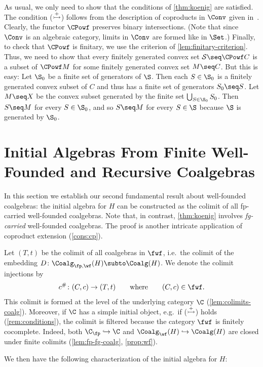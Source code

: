 \documentclass[a4paper,UKenglish, autoref, numberwithinsect, final]{lipics-v2021}
\numberwithin{equation}{section}
\newenvironment{proofhere}[2][Proof of]{%
  \proof{#1~\autoref{#2}}%
}{%
  \endproof%
  \par%
}
\newenvironment{proofappendix}[2][Proof of]{%
    \begin{proofhere}[#1]{#2}
  }{%
    \end{proofhere}
  }
\newcommand{\injmono}{\ensuremath{\overset{\smash{\raisebox{-1pt}{\ensuremath{\scriptstyle+}}}}{\rightarrowtail}}}%
\theoremstyle{plain}
\theoremstyle{definition}
\begin{document}
\begin{proofappendix}{thm:koenig-convex}
As usual, we only need to show that the conditions of \autoref{thm:koenig} are satisfied. The condition (\injmono) follows from the description of coproducts in $\Conv$ given in~\cite[Prop.~5]{jww15}. Clearly, the functor $\CPowf$ preserves binary intersections. (Note that since $\Conv$ is an algebraic category, limits in $\Conv$ are formed like in $\Set$.) Finally, to check that $\CPowf$ is finitary, we use the criterion of \autoref{lem:finitary-criterion}. Thus, we need to show that every finitely generated convex set $\mathcal{S}\seq \CPowf C$ is a subset of $\CPowf M$ for some finitely generated convex set $M\seq C$. But this is easy: Let $\S_0$ be a finite set of generators of $\S$. Then each $S\in \S_0$ is a finitely generated convex subset of $C$ and thus has a finite set of generators $S_0\seq S$. Let $M\seq X$ be the convex subset generated by the finite set $\bigcup_{S\in \S_0} S_0$. Then $S\seq M$ for every $S\in \S_0$, and so $S\seq M$ for every $S\in \S$ because $\S$ is generated by $\S_0$.
\end{proofappendix}

\section{Initial Algebras From Finite Well-Founded and Recursive Coalgebras}\label{sec:initial-algebras}
In this section we establish our second fundamental result about well-founded coalgebras: the initial algebra for $H$ can be constructed as the colimit of all fp-carried well-founded coalgebras. Note that, in contrast, \autoref{thm:koenig} involves \emph{fg-carried} well-founded coalgebras. The proof is another intricate application of coproduct extension (\autoref{cons:cp}).

\begin{construction}\label{not:T}
Let $(T,t)$ be the colimit of all coalgebras in $\fwf$, i.e.\ the colimit of the embedding
$D\colon \Coalg_{\fp,\wf}(H)\subto \Coalg(H)$.
We denote the colimit injections by
\[ c^\#\colon (C,c)\to (T,t) \qquad \text{where} \qquad (C,c)\in \fwf. \]
This colimit is formed at the level of the underlying category $\C$ (\autoref{lem:colimits-coalg}). Moreover, if $\C$  has a simple initial object, e.g.~if (\injmono) holds (\autoref{rem:conditions}), the colimit is filtered because the category $\fwf$ is finitely cocomplete. Indeed, both $\C_\fp\hookrightarrow \C$ and $\Coalg_\wf(H)\hookrightarrow \Coalg(H)$ are closed under finite colimits (\autoref{lem:fp-fg-coalg}, \autoref{prop:wf}).
\end{construction}
We then have the following characterization of the initial algebra for $H$:
\end{document}
